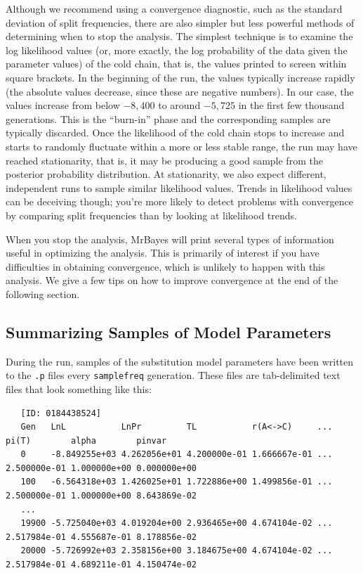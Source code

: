 \documentclass[12pt]{book}
\newcommand{\ttt}[1]{\texttt{#1}}
\begin{document}
Although we recommend using a convergence diagnostic, such as the standard deviation of split
frequencies, there are also simpler but less powerful methods of determining when to stop the
analysis. The simplest technique is to examine the log likelihood values (or, more exactly, the log
probability of the data given the parameter values) of the cold chain, that is, the values printed
to screen within square brackets. In the beginning of the run, the values typically increase
rapidly (the absolute values decrease, since these are negative numbers). In our case, the values
increase from below $-8,400$ to around $-5,725$ in the first few thousand generations. This is the
``burn-in'' phase and the corresponding samples are typically discarded. Once the likelihood of
the cold chain stops to increase and starts to randomly fluctuate within a more or less stable
range, the run may have reached stationarity, that is, it may be producing a good sample from the
posterior probability distribution. At stationarity, we also expect different, independent runs to
sample similar likelihood values. Trends in likelihood values can be deceiving though; you're more
likely to detect problems with convergence by comparing split frequencies than by looking at
likelihood trends.

When you stop the analysis, MrBayes will print several types of information useful in optimizing
the analysis. This is primarily of interest if you have difficulties in obtaining convergence,
which is unlikely to happen with this analysis. We give a few tips on how to improve convergence at
the end of the following section.

\subsection{Summarizing Samples of Model Parameters}

During the run, samples of the substitution model parameters have been written to the \ttt{.p}
files every \ttt{samplefreq} generation. These files are tab-delimited text files that look
something like this:

\begin{singlespacing}
\scriptsize
\begin{verbatim}
   [ID: 0184438524]
   Gen   LnL           LnPr         TL           r(A<->C)     ... pi(T)        alpha        pinvar
   0     -8.849255e+03 4.262056e+01 4.200000e-01 1.666667e-01 ... 2.500000e-01 1.000000e+00 0.000000e+00
   100   -6.564318e+03 1.426025e+01 1.722886e+00 1.499856e-01 ... 2.500000e-01 1.000000e+00 8.643869e-02
   ...
   19900 -5.725040e+03 4.019204e+00 2.936465e+00 4.674104e-02 ... 2.517984e-01 4.555687e-01 8.178856e-02
   20000 -5.726992e+03 2.358156e+00 3.184675e+00 4.674104e-02 ... 2.517984e-01 4.689211e-01 4.150474e-02
\end{verbatim}
\normalsize
\end{singlespacing}
\end{document}
